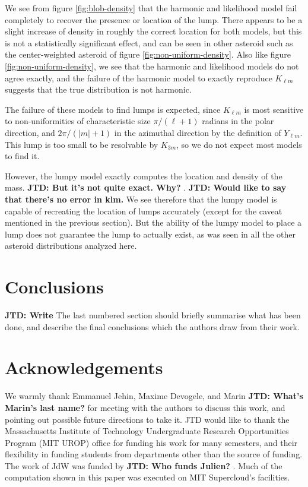 \documentclass[fleqn,usenatbib]{mnras}
\newcommand{\jtd}[1]{ {\bf{\color{red} JTD: #1}} }
\begin{document}
We see from figure \ref{fig:blob-density} that the harmonic and likelihood model fail completely to recover the presence or location of the lump. There appears to be a slight increase of density in roughly the correct location for both models, but this is not a statistically significant effect, and can be seen in other asteroid such as the center-weighted asteroid of figure \ref{fig:non-uniform-density}. Also like figure \ref{fig:non-uniform-density}, we see that the harmonic and likelihood models do not agree exactly, and the failure of the harmonic model to exactly reproduce $K_{\ell m}$ suggests that the true distribution is not harmonic.

The failure of these models to find lumps is expected, since $K_{\ell m}$ is most sensitive to non-uniformities of characteristic size $\pi/(\ell + 1)$ radians in the polar direction, and $2\pi / (|m|+1)$ in the azimuthal direction by the definition of $Y_{\ell m}$. This lump is too small to be resolvable by $K_{3m}$, so we do not expect most models to find it.

However, the lumpy model exactly computes the location and density of the mass. \jtd{But it's not quite exact. Why?}. \jtd{Would like to say that there's no error in klm.} We see therefore that the lumpy model is capable of recreating the location of lumps accurately (except for the caveat mentioned in the previous section). But the ability of the lumpy model to place a lump does not guarantee the lump to actually exist, as was seen in all the other asteroid distributions analyzed here.

\section{Conclusions}

\jtd{Write}
The last numbered section should briefly summarise what has been done, and describe
the final conclusions which the authors draw from their work.

\section*{Acknowledgements}

We warmly thank Emmanuel Jehin, Maxime Devogele, and Marin \jtd{What's Marin's last name?} for meeting with the authors to discuss this work, and pointing out possible future directions to take it. JTD would like to thank the Massachusetts Institute of Technology Undergraduate Research Opportunities Program (MIT UROP) office for funding his work for many semesters, and their flexibility in funding students from departments other than the source of funding. The work of JdW was funded by \jtd{Who funds Julien?}. Much of the computation shown in this paper was executed on MIT Supercloud's facilities.
\end{document}
